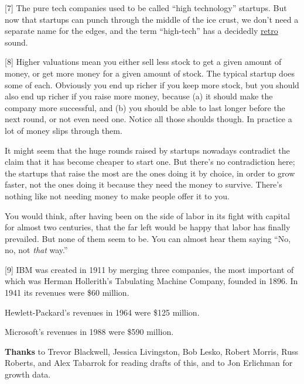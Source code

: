 {[}7{]} The pure tech companies used to be called ``high technology''
startups. But now that startups can punch through the middle of the ice
crust, we don't need a separate name for the edges, and the term
``high-tech'' has a decidedly
\href{https://books.google.com/ngrams/graph?content=high+tech&year_start=1900&year_end=2019&corpus=en-2019&smoothing=3}{retro}
sound.

{[}8{]} Higher valuations mean you either sell less stock to get a given
amount of money, or get more money for a given amount of stock. The
typical startup does some of each. Obviously you end up richer if you
keep more stock, but you should also end up richer if you raise more
money, because (a) it should make the company more successful, and (b)
you should be able to last longer before the next round, or not even
need one. Notice all those shoulds though. In practice a lot of money
slips through them.

It might seem that the huge rounds raised by startups nowadays
contradict the claim that it has become cheaper to start one. But
there's no contradiction here; the startups that raise the most are the
ones doing it by choice, in order to grow faster, not the ones doing it
because they need the money to survive. There's nothing like not needing
money to make people offer it to you.

You would think, after having been on the side of labor in its fight
with capital for almost two centuries, that the far left would be happy
that labor has finally prevailed. But none of them seem to be. You can
almost hear them saying ``No, no, not \emph{that} way.''

{[}9{]} IBM was created in 1911 by merging three companies, the most
important of which was Herman Hollerith's Tabulating Machine Company,
founded in 1896. In 1941 its revenues were \$60 million.

Hewlett-Packard's revenues in 1964 were \$125 million.

Microsoft's revenues in 1988 were \$590 million.

\textbf{Thanks} to Trevor Blackwell, Jessica Livingston, Bob Lesko,
Robert Morris, Russ Roberts, and Alex Tabarrok for reading drafts of
this, and to Jon Erlichman for growth data.
